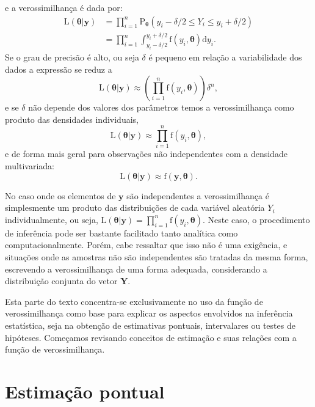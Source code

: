 \documentclass[
  9pt,
  a5paper,
]{book}
\theoremstyle{definition}
\theoremstyle{definition}
\theoremstyle{definition}
\theoremstyle{definition}
\theoremstyle{remark}
\begin{document}
e a verossimilhança é dada por:
\begin{align*}
\mathrm{L}(\boldsymbol{\theta}|\mathbf{y}) &= \prod_{i=1}^n \mathrm{P}_{\boldsymbol{\theta} }(y_i - \delta/2 \leq Y_i \leq y_i + \delta/2) \\
&= \prod_{i=1}^n \int_{y_i - \delta/2}^{y_i + \delta/2} \mathrm{f}(y_i , \boldsymbol{\theta}) \mathrm{d}y_i.
\end{align*}
Se o grau de precisão é alto, ou seja \(\delta\) é pequeno em relação a variabilidade dos dados a expressão se reduz a
\[ 
\mathrm{L}(\boldsymbol{\theta}|\mathbf{y}) \approx \left(\prod_{i=1}^n \mathrm{f}(y_i, \boldsymbol{\theta}) \right) \delta^n  , 
\label{eq:veroiid}
\]
e se \(\delta\) não depende dos valores dos parâmetros temos a verossimilhança
como produto das densidades individuais,\\
\begin{equation}\label{eq:veroiid}
\mathrm{L}(\boldsymbol{\theta}|\mathbf{y}) \approx \prod_{i=1}^n \mathrm{f}(y_i, \boldsymbol{\theta})  ,
\end{equation}
e de forma mais geral para observações não independentes
com a densidade multivariada:
\begin{equation}\label{eq:veromv}
\mathrm{L}(\boldsymbol{\theta}|\mathbf{y}) \approx \mathrm{f}(\mathbf{y}, \boldsymbol{\theta}) .
\end{equation}

No caso onde os elementos de \(\mathbf{y}\) são independentes a verossimilhança é simplesmente um produto das distribuições de cada variável aleatória \(Y_i\) individualmente, ou seja, \(\mathrm{L}(\boldsymbol{\theta}| \mathbf{y}) = \prod_{i=1}^n \mathrm{f}(y_i, \boldsymbol{\theta})\).
Neste caso, o procedimento de inferência pode ser bastante facilitado tanto analítica como computacionalmente. Porém, cabe ressaltar que isso não é uma exigência, e situações onde as amostras não são independentes são tratadas da mesma forma, escrevendo a verossimilhança de uma forma adequada,
considerando a distribuição conjunta do vetor \(\mathbf{Y}\).

Esta parte do texto concentra-se exclusivamente no uso da função de verossimilhança como base para explicar os aspectos envolvidos na inferência estatística, seja na obtenção de estimativas pontuais, intervalares ou testes de hipóteses. Começamos revisando conceitos de estimação e suas relações com a função de verossimilhança.

\hypertarget{estimauxe7uxe3o-pontual}{%
\section{Estimação pontual}\label{estimauxe7uxe3o-pontual}}
\end{document}

